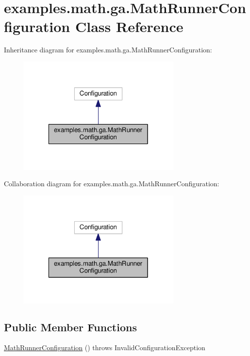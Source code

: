 \hypertarget{classexamples_1_1math_1_1ga_1_1_math_runner_configuration}{\section{examples.\-math.\-ga.\-Math\-Runner\-Configuration Class Reference}
\label{classexamples_1_1math_1_1ga_1_1_math_runner_configuration}
}


Inheritance diagram for examples.\-math.\-ga.\-Math\-Runner\-Configuration\-:
\nopagebreak
\begin{figure}[H]
\begin{center}
\leavevmode
\includegraphics[width=232pt]{classexamples_1_1math_1_1ga_1_1_math_runner_configuration__inherit__graph}
\end{center}
\end{figure}


Collaboration diagram for examples.\-math.\-ga.\-Math\-Runner\-Configuration\-:
\nopagebreak
\begin{figure}[H]
\begin{center}
\leavevmode
\includegraphics[width=232pt]{classexamples_1_1math_1_1ga_1_1_math_runner_configuration__coll__graph}
\end{center}
\end{figure}
\subsection*{Public Member Functions}
\begin{DoxyCompactItemize}
\item 
\hyperlink{classexamples_1_1math_1_1ga_1_1_math_runner_configuration_a18e3e954ce66ce5cb2723da58c0d4725}{Math\-Runner\-Configuration} ()  throws Invalid\-Configuration\-Exception 
\end{DoxyCompactItemize}
